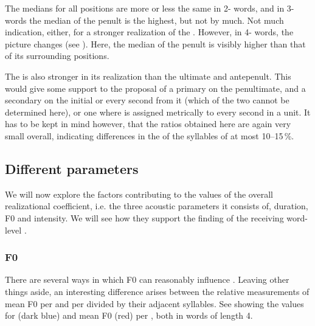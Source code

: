 \documentclass[output=paper]{LSP/langsci}
\begin{document}


The medians for all positions are more or less the same in 2- words, and in 3- words the median of the penult is the highest, but not by much. Not much indication, either, for a stronger realization of the . However, in 4- words, the picture changes (see ). Here, the median of the penult is visibly higher than that of its surrounding positions.  



The  is also stronger in its realization than the ultimate and antepenult. This would give some support to the proposal of a primary  on the penultimate, and a secondary  on the initial or every second  from it (which of the two cannot be determined here), or one where  is assigned metrically to every second  in a unit. It has to be kept in mind however, that the ratios obtained here are again very small overall, indicating differences in the  of the syllables of at most 10--15\,\%.

\subsection{Different parameters}
We will now explore the factors contributing to the values of the overall realizational coefficient, i.e. the three acoustic parameters it consists of, duration, F0 and intensity. We will see how they support the finding of the  receiving word-level . 

\subsubsection{F0}
There are several ways in which F0 can reasonably influence . Leaving other things aside, an interesting difference arises between the relative measurements of mean F0 per  and  per  divided by their adjacent syllables. See  showing the values for  (dark blue) and mean F0 (red) per , both in words of length 4.
\end{document}
